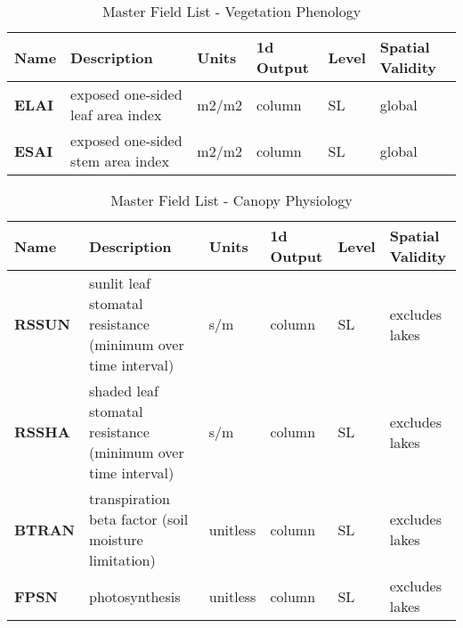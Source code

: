 \begin{longtable}{|l|p{2.3in}|l|l|l|p{1.0in}|} 
\caption{\label{master_field_list_vegphen} Master Field List - Vegetation Phenology} \\
\hline
\endhead
\hline
Name & Description & Units & 1d Output & Level & Spatial Validity  \\ 
\hline	\hline	

{\bf ELAI} 
& exposed one-sided leaf area index   
& m2/m2      
& column  
& SL
& global \\
\hline 

{\bf ESAI} 
& exposed one-sided stem area index   
& m2/m2      
& column  
& SL
& global \\
\hline 

\end{longtable}
      
\begin{longtable}{|l|p{2.3in}|l|l|l|p{1.0in}|} 
\caption{\label{master_field_list_canopy} Master Field List - Canopy Physiology} \\
\hline
\endhead
\hline
Name & Description & Units & 1d Output & Level & Spatial Validity  \\ 
\hline	\hline	

{\bf RSSUN} 
& sunlit leaf stomatal resistance  (minimum over time interval)    
& s/m      
& column  
& SL
& excludes lakes \\
\hline 

{\bf RSSHA} 
& shaded leaf stomatal resistance (minimum over time interval)  
& s/m      
& column  
& SL
& excludes lakes \\
\hline 

{\bf BTRAN} 
& transpiration beta factor (soil moisture limitation)   
& unitless      
& column  
& SL
& excludes lakes \\
\hline 

{\bf FPSN} 
& photosynthesis   
& unitless      
& column  
& SL
& excludes lakes \\
\hline

\end{longtable}


